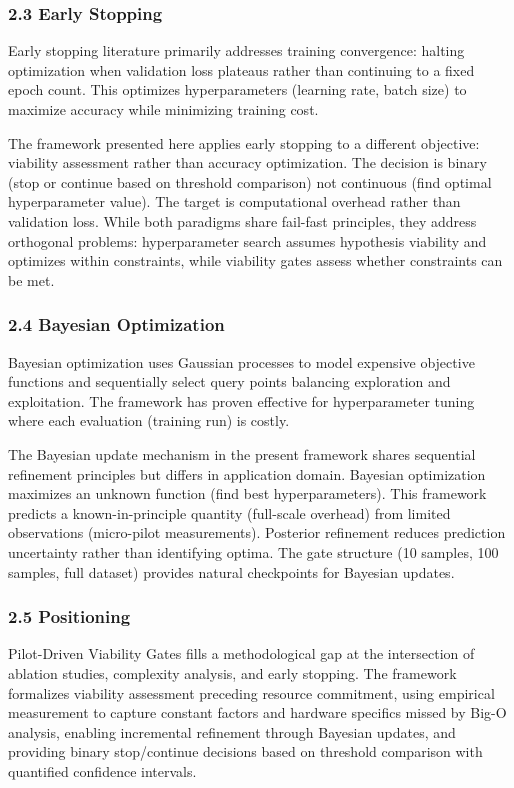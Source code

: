 \subsubsection{2.3 Early Stopping}

Early stopping literature primarily addresses training convergence: halting optimization when validation loss plateaus rather than continuing to a fixed epoch count. This optimizes hyperparameters (learning rate, batch size) to maximize accuracy while minimizing training cost.

The framework presented here applies early stopping to a different objective: viability assessment rather than accuracy optimization. The decision is binary (stop or continue based on threshold comparison) not continuous (find optimal hyperparameter value). The target is computational overhead rather than validation loss. While both paradigms share fail-fast principles, they address orthogonal problems: hyperparameter search assumes hypothesis viability and optimizes within constraints, while viability gates assess whether constraints can be met.

\subsubsection{2.4 Bayesian Optimization}

Bayesian optimization uses Gaussian processes to model expensive objective functions and sequentially select query points balancing exploration and exploitation. The framework has proven effective for hyperparameter tuning where each evaluation (training run) is costly.

The Bayesian update mechanism in the present framework shares sequential refinement principles but differs in application domain. Bayesian optimization maximizes an unknown function (find best hyperparameters). This framework predicts a known-in-principle quantity (full-scale overhead) from limited observations (micro-pilot measurements). Posterior refinement reduces prediction uncertainty rather than identifying optima. The gate structure (10 samples, 100 samples, full dataset) provides natural checkpoints for Bayesian updates.

\subsubsection{2.5 Positioning}

Pilot-Driven Viability Gates fills a methodological gap at the intersection of ablation studies, complexity analysis, and early stopping. The framework formalizes viability assessment preceding resource commitment, using empirical measurement to capture constant factors and hardware specifics missed by Big-O analysis, enabling incremental refinement through Bayesian updates, and providing binary stop/continue decisions based on threshold comparison with quantified confidence intervals.
